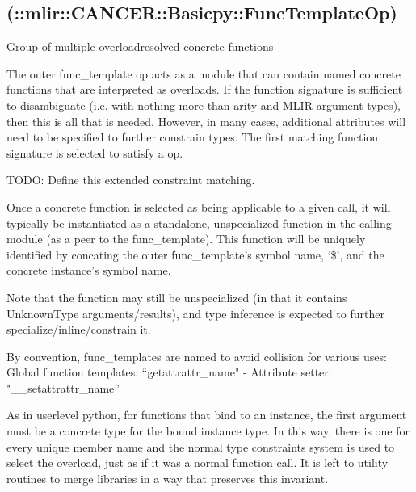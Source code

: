 \documentclass[letterpaper,10pt,english]{sphinxmanual}
\begin{document}
\subsection{ (::mlir::CANCER::Basicpy::FuncTemplateOp)}
\label{\detokenize{Basicpy/index:basicpy-func-template-mlir-cancer-basicpy-functemplateop}}
\sphinxAtStartPar
Group of multiple overload\sphinxhyphen{}resolved concrete functions

\sphinxAtStartPar
The outer func\_template op acts as a module that can contain named
concrete functions that are interpreted as overloads. If the function
signature is sufficient to disambiguate (i.e. with nothing more than
arity and MLIR argument types), then this is all that is needed.
However, in many cases, additional attributes will need to be specified
to further constrain types. The first matching function signature is
selected to satisfy a  op.

\sphinxAtStartPar
TODO: Define this extended constraint matching.

\sphinxAtStartPar
Once a concrete function is selected as being applicable to a given
call, it will typically be instantiated as a standalone, unspecialized
function in the calling module (as a peer to the func\_template). This
function will be uniquely identified by concating the outer
func\_template’s symbol name, ‘\$’, and the concrete instance’s symbol
name.

\sphinxAtStartPar
Note that the function may still be unspecialized (in that it contains
UnknownType arguments/results), and type inference is expected to
further specialize/inline/constrain it.

\sphinxAtStartPar
By convention, func\_templates are named to avoid collision for various
uses: \sphinxhyphen{} Global function templates:
“getattrattr_name"   - Attribute setter: "__setattrattr\_name”

\sphinxAtStartPar
As in user\sphinxhyphen{}level python, for functions that bind to an instance, the
first argument must be a concrete type for the bound instance type. In
this way, there is one  for every unique member name
and the normal type constraints system is used to select the overload,
just as if it was a normal function call. It is left to utility routines
to merge libraries in a way that preserves this invariant.
\end{document}
